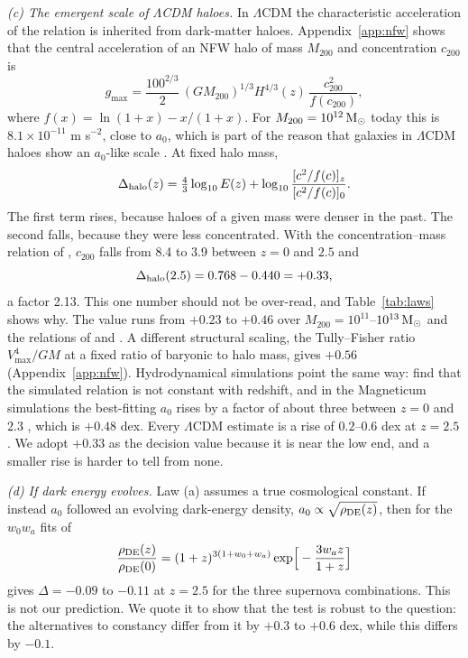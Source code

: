 \documentclass[fleqn,usenatbib]{mnras}
\begin{document}
\emph{(c) The emergent scale of $\Lambda$CDM haloes.} In $\Lambda$CDM the characteristic acceleration of the relation is inherited from dark-matter haloes. Appendix~\ref{app:nfw} shows that the central acceleration of an NFW halo \citep{NFW1997} of mass $M_{200}$ and concentration $c_{200}$ is
\begin{equation}
g_{\max}=\frac{100^{2/3}}{2}\,(GM_{200})^{1/3}H^{4/3}(z)\,\frac{c_{200}^2}{f(c_{200})},
\label{eq:gmax}
\end{equation}
where $f(x)=\ln(1+x)-x/(1+x)$. For $M_{200}=10^{12}\,{\rm M_\odot}$ today this is $8.1\times10^{-11}$ m s$^{-2}$, close to $a_0$, which is part of the reason that galaxies in $\Lambda$CDM haloes show an $a_0$-like scale \citep{Navarro2017}. At fixed halo mass,
\begin{equation}
\Delta_{\rm halo}(z)=\tfrac43\log_{10}E(z)+\log_{10}\frac{[c^2/f(c)]_z}{[c^2/f(c)]_0} .
\label{eq:lawhalo}
\end{equation}
The first term rises, because haloes of a given mass were denser in the past. The second falls, because they were less concentrated. With the concentration--mass relation of \citet{DuttonMaccio2014}, $c_{200}$ falls from 8.4 to 3.9 between $z=0$ and $2.5$ and
\begin{equation}
\Delta_{\rm halo}(2.5)=0.768-0.440=+0.33 ,
\end{equation}
a factor 2.13. This one number should not be over-read, and Table~\ref{tab:laws} shows why. The value runs from $+0.23$ to $+0.46$ over $M_{200}=10^{11}$--$10^{13}\,{\rm M_\odot}$ and the relations of \citet{DuttonMaccio2014} and \citet{Duffy2008}. A different structural scaling, the Tully--Fisher ratio $V_{\max}^4/GM$ at a fixed ratio of baryonic to halo mass, gives $+0.56$ (Appendix~\ref{app:nfw}). Hydrodynamical simulations point the same way: \citet{KellerWadsley2017} find that the simulated relation is not constant with redshift, and in the Magneticum simulations the best-fitting $a_0$ rises by a factor of about three between $z=0$ and $2.3$ \citep{Mayer2023}, which is $+0.48$ dex. Every $\Lambda$CDM estimate is a rise of $0.2$--$0.6$ dex at $z=2.5$. We adopt $+0.33$ as the decision value because it is near the low end, and a smaller rise is harder to tell from none.

\emph{(d) If dark energy evolves.} Law (a) assumes a true cosmological constant. If instead $a_0$ followed an evolving dark-energy density, $a_0\propto\sqrt{\rho_{\rm DE}(z)}$, then for the $w_0w_a$ fits of \citet{DESI2025}
\begin{equation}
\frac{\rho_{\rm DE}(z)}{\rho_{\rm DE}(0)}=(1+z)^{3(1+w_0+w_a)}\exp\!\Big[-\frac{3w_az}{1+z}\Big]
\end{equation}
gives $\Delta=-0.09$ to $-0.11$ at $z=2.5$ for the three supernova combinations. This is not our prediction. We quote it to show that the test is robust to the question: the alternatives to constancy differ from it by $+0.3$ to $+0.6$ dex, while this differs by $-0.1$.
\end{document}
